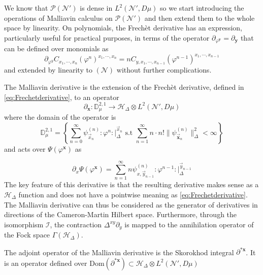 \documentclass[12pt]{article}%
\begin{document}
We know that $\mathcal{P}(\mathcal{N}')$ is dense in $L^2(\mathcal{N}',D\mu)$ so we start introducing the operations of Malliavin calculus on $\mathcal{P}(\mathcal{N}')$ and then extend them to the whole space by linearity. On polynomials, the Frechèt derivative has an expression, particularly useful for practical purposes, in terms of the operator $\partial_{\varphi^\mathbf{y}}=\partial_{\mathbf{y}}$ that can be defined over monomials as 
\begin{equation}
\label{eq:Frechetderivative}
\partial_{\varphi^y} C_{x_1,\cdots,x_n}(\varphi^n)^{x_1,\cdots,x_n}=nC_{y,x_1,\cdots,x_{n-1}}(\varphi^{n-1})^{x_1,\cdots,x_{n-1}}
\end{equation}
and extended by linearity to $(\mathcal{N})$ without further complications.

The Malliavin derivative is the extension of the Frechèt derivative, defined in \eqref{eq:Frechetderivative}, to an operator 
\begin{equation}
\label{eq:malliavinDerivative}
\partial_\mathbf{x}: \mathbb{D}_\mu^{2,1}\longrightarrow \mathcal{H}_\Delta\otimes L^2(\mathcal{N}',D\mu)
\end{equation}
where the domain of the operator is
\begin{equation}
    \label{eq:MalliavinSovoleb}
    \mathbb{D}_\mu^{2,1}=\left\{\sum_{n=0}^\infty\psi^{(n)}_{\vec{x}_n}:\varphi^n:\lvert_\Delta^{\vec{x}_n}\textrm{ s.t } \sum_{n=1}^\infty n\cdot n!\lVert\psi^{(n)}_{\vec{\mathbf{x}}_n}\rVert_{\Delta}^2< \infty \right\}
\end{equation}
and acts over $\Psi(\varphi^\mathbf{x})$ as

\begin{equation}
\label{eq:actionMalliavin}
\partial_x\Psi(\varphi^\mathbf{x})=\sum_{n=1}^\infty n\psi^{(n)}_{x,\vec{y}_{n-1}}:\varphi^{n-1}:\lvert_\Delta^{\vec{y}_{n-1}}
\end{equation}
The key feature of this derivative is that the resulting derivative makes sense as a $\mathcal{H}_\Delta$ function and does not have a pointwise meaning as  \eqref{eq:Frechetderivative}. The Malliavin derivative can thus be considered as the generator of derivatives in directions of the Cameron-Martin Hilbert space. Furthermore, through the isomorphism $\mathcal{I}$, the contraction $\Delta^{xy}\partial_y$ is mapped to the annihilation operator of the Fock space $\Gamma(\mathcal{H}_\Delta)$.

The adjoint operator of the Malliavin derivative is the Skorokhod integral $\partial^{*\mathbf{x}}$. It is an operator defined over $\textrm{Dom}(\partial^{*\mathbf{x}})\subset\mathcal{H}_\Delta\otimes L^2(\mathcal{N}',D\mu)$ 
\end{document}
